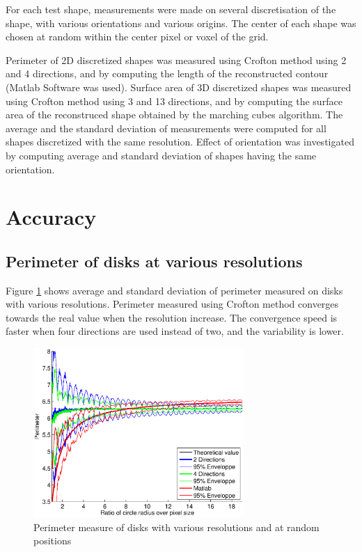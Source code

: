 \documentclass{InsightArticle}
\begin{document}
For each test shape, measurements were made on
several discretisation of the shape, with various orientations and various origins.
The center of each shape was chosen at random within the center pixel or voxel of the grid.

Perimeter of 2D discretized shapes was measured using Crofton method using 2 and 4 directions, 
and by computing the length of the reconstructed contour (Matlab Software was used).
Surface area of 3D discretized shapes was measured using Crofton method using 3 and 13 directions, 
and by computing the surface area of the reconstruced shape obtained by the marching cubes algorithm.
The average and the standard deviation of measurements were computed for all shapes discretized
with the same resolution. Effect of orientation was investigated by computing average and standard 
deviation of shapes having the same orientation.


\section{Accuracy}

\subsection{Perimeter of disks at various resolutions}

Figure \ref{fig:MeasureDiskPerimeter} shows average and standard deviation of perimeter
measured on disks with various resolutions. Perimeter measured using Crofton method converges
towards the real value when the resolution increase. 
The convergence speed is faster when four directions are used instead of two, 
and the variability is lower.

\begin{figure}[!htb]
\begin{center}
\includegraphics[width=8cm]{images/perimeterDisks}
\end{center}
\caption{Perimeter measure of disks with various resolutions and at random positions}
\label{fig:MeasureDiskPerimeter}
\end{figure}
\end{document}
